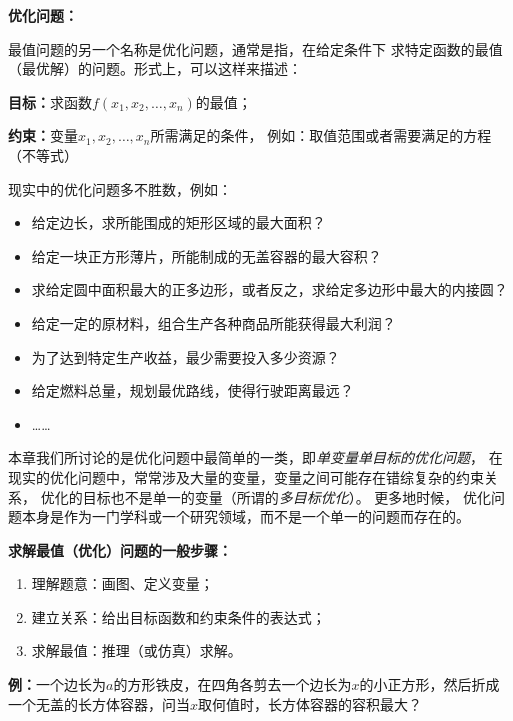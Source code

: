 \begin{shaded}
	{\bf 优化问题：}
	
	最值问题的另一个名称是优化问题，通常是指，在给定条件下
	求特定函数的最值（最优解）的问题。形式上，可以这样来描述：
	
	\begin{tcolorbox}
		{\bf 目标：}求函数$f(x_1,x_2,\ldots,x_n)$的最值；
	
		{\bf 约束：}变量$x_1,x_2,\ldots,x_n$所需满足的条件，
		例如：取值范围或者需要满足的方程（不等式）
	\end{tcolorbox}
	现实中的优化问题多不胜数，例如：	
	\begin{itemize}
	  \item 给定边长，求所能围成的矩形区域的最大面积？
	  \item 给定一块正方形薄片，所能制成的无盖容器的最大容积？
	  \item 求给定圆中面积最大的正多边形，或者反之，求给定多边形中最大的内接圆？
	  \item 给定一定的原材料，组合生产各种商品所能获得最大利润？
	  \item 为了达到特定生产收益，最少需要投入多少资源？
	  \item 给定燃料总量，规划最优路线，使得行驶距离最远？
	  \item \ldots \ldots
	\end{itemize}
	
	本章我们所讨论的是优化问题中最简单的一类，即{\it 单变量单目标的优化问题}，
	在现实的优化问题中，常常涉及大量的变量，变量之间可能存在错综复杂的约束关系，
	优化的目标也不是单一的变量（所谓的{\it 多目标优化}）。	更多地时候，
	优化问题本身是作为一门学科或一个研究领域，而不是一个单一的问题而存在的。
\end{shaded}

\begin{thx}
	{\bf 求解最值（优化）问题的一般步骤：}
	\begin{enumerate}[(1)]
	  \item 理解题意：画图、定义变量；
	  \item 建立关系：给出目标函数和约束条件的表达式；
	  \item 求解最值：推理（或仿真）求解。
	\end{enumerate}
\end{thx}


{\bf 例：}一个边长为$a$的方形铁皮，在四角各剪去一个边长为$x$的小正方形，然后折成
一个无盖的长方体容器，问当$x$取何值时，长方体容器的容积最大？

